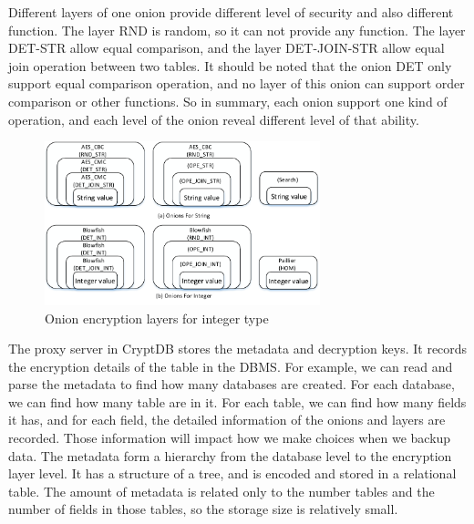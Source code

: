 Different layers of one onion provide different level of security and also different function. The layer RND is random, so it can not provide any function. The layer DET-STR allow equal comparison, and the layer DET-JOIN-STR allow equal join operation between two tables. It should be noted that the onion DET only support equal comparison operation, and no layer of this onion can support order comparison or other functions. So in summary, each onion support one kind of operation, and each level of the onion reveal different level of that ability.





\begin{figure}[tb]
\centering
\includegraphics[width=8cm]{images/Onions.pdf}
\caption{Onion encryption layers for integer type}
\label{fig:stack2}
\end{figure}


The proxy server in CryptDB stores the metadata and decryption keys. It records the encryption details of the table in the DBMS. For example, we can read and parse the metadata to find how many databases are created. For each database, we can find how many table are in it. For each table, we can find how many fields it has, and for each field, the detailed information of the onions and layers are recorded. Those information will impact how we make choices when we backup data. The metadata form a hierarchy from the database level to the encryption layer level. It has a structure of a tree, and is encoded and stored in a relational table. The amount of metadata is related only to the number tables and the number of fields in those tables, so the storage size is relatively small.






